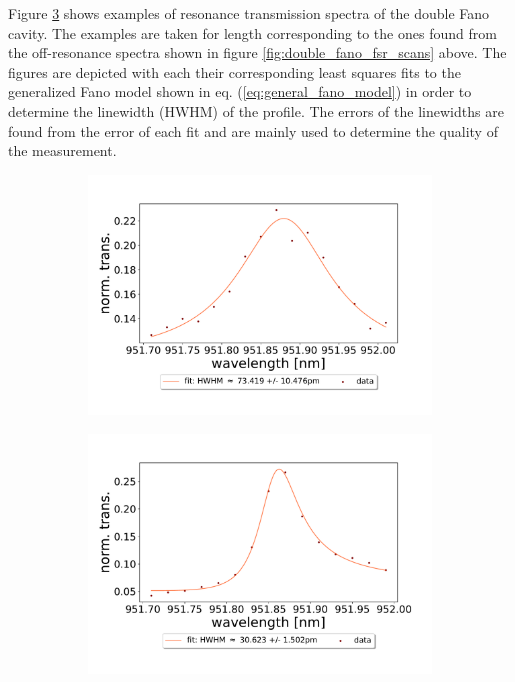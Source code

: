Figure \ref{fig:double_fano_trans_data} shows examples of resonance transmission spectra of the double Fano cavity. The examples are taken for length corresponding to the ones found from the off-resonance spectra shown in figure \ref{fig:double_fano_fsr_scans} above. The figures are depicted with each their corresponding least squares fits to the generalized Fano model shown in eq. (\ref{eq:general_fano_model}) in order to determine the linewidth (HWHM) of the profile. The errors of the linewidths are found from the error of each fit and are mainly used to determine the quality of the measurement. 

\begin{figure}[h!]
    \centering
    \begin{subfigure}[b]{0.49\textwidth}
        \centering
        \includegraphics[width=\textwidth]{figures/results/double fano fits/30um_M3:M5_fit_4.pdf}
        \caption{}
        \label{fig:short_double_fano_trans}
    \end{subfigure}
    \begin{subfigure}[b]{0.49\textwidth}
        \centering
        \includegraphics[width=\textwidth]{figures/results/double fano fits/550um_M3:M5_fit_1.pdf}
        \caption{}
        \label{fig:long_double_fano_trans}
    \end{subfigure}
    \caption{}
    \label{fig:double_fano_trans_data}
\end{figure}

